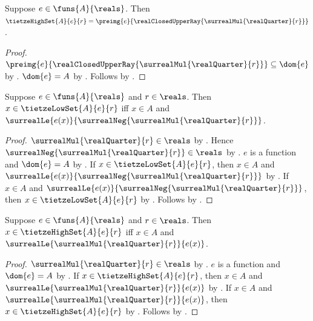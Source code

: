 \begin{proposition}\label{tietze_high_set_eq_preimage}
    Suppose $e\in\funs{A}{\reals}$.
    Then $\tietzeHighSet{A}{e}{r}
        =\preimg{e}{\realClosedUpperRay{
            \surrealMul{\realQuarter}{r}}}$.
\end{proposition}
\begin{proof}
    $\preimg{e}{\realClosedUpperRay{
        \surrealMul{\realQuarter}{r}}}\subseteq\dom{e}$
        by .
    $\dom{e}=A$ by .
    Follows by
        .
\end{proof}

\begin{proposition}\label{tietze_low_set_member_iff}
    Suppose $e\in\funs{A}{\reals}$ and $r\in\reals$.
    Then $x\in\tietzeLowSet{A}{e}{r}$ iff
        $x\in A$ and
        $\surrealLe{e(x)}
            {\surrealNeg{\surrealMul{\realQuarter}{r}}}$.
\end{proposition}
\begin{proof}
    $\surrealMul{\realQuarter}{r}\in\reals$
        by .
    Hence $\surrealNeg{\surrealMul{\realQuarter}{r}}\in\reals$
        by .
    $e$ is a function and $\dom{e}=A$
        by .
    If $x\in\tietzeLowSet{A}{e}{r}$, then
        $x\in A$ and
        $\surrealLe{e(x)}
            {\surrealNeg{\surrealMul{\realQuarter}{r}}}$
        by
        .
    If $x\in A$ and
        $\surrealLe{e(x)}
            {\surrealNeg{\surrealMul{\realQuarter}{r}}}$, then
        $x\in\tietzeLowSet{A}{e}{r}$
        by
        .
    Follows by \auto.
\end{proof}

\begin{proposition}\label{tietze_high_set_member_iff}
    Suppose $e\in\funs{A}{\reals}$ and $r\in\reals$.
    Then $x\in\tietzeHighSet{A}{e}{r}$ iff
        $x\in A$ and
        $\surrealLe{\surrealMul{\realQuarter}{r}}{e(x)}$.
\end{proposition}
\begin{proof}
    $\surrealMul{\realQuarter}{r}\in\reals$
        by .
    $e$ is a function and $\dom{e}=A$
        by .
    If $x\in\tietzeHighSet{A}{e}{r}$, then
        $x\in A$ and
        $\surrealLe{\surrealMul{\realQuarter}{r}}{e(x)}$
        by
        .
    If $x\in A$ and
        $\surrealLe{\surrealMul{\realQuarter}{r}}{e(x)}$, then
        $x\in\tietzeHighSet{A}{e}{r}$
        by
        .
    Follows by \auto.
\end{proof}

